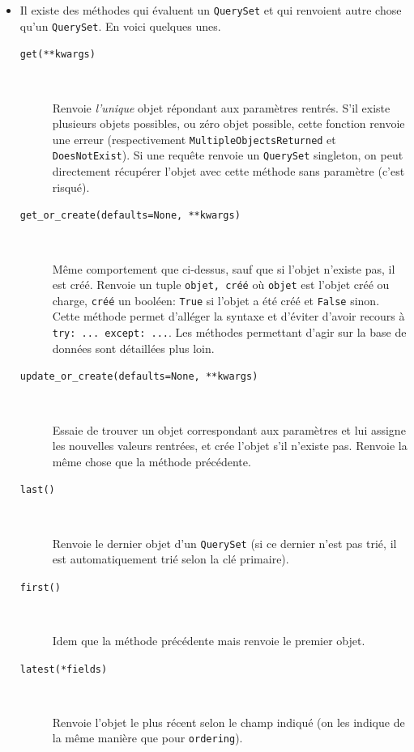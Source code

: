 \documentclass[a4paper, 10pt]{article}
\newcommand{\code}[1]{{\small\texttt{#1}}}
\begin{document}
{\begin{itemize}
    \item Il existe des méthodes qui évaluent un \code{QuerySet} et qui renvoient autre chose qu'un \code{QuerySet}. En voici quelques unes.

    \begin{description}
        \item[\texttt{get(**kwargs)}]~

        Renvoie \emph{l'unique} objet répondant aux paramètres rentrés. S'il existe plusieurs objets possibles, ou zéro objet possible, cette fonction renvoie une erreur (respectivement \code{MultipleObjectsReturned} et \code{DoesNotExist}). Si une requête renvoie un \code{QuerySet} singleton, on peut directement récupérer l'objet avec cette méthode sans paramètre (c'est risqué).

        \item[\texttt{get_or_create(defaults=None, **kwargs)}]~

        Même comportement que ci-dessus, sauf que si l'objet n'existe pas, il est créé. Renvoie un tuple \code{objet, créé} où \code{objet} est l'objet créé ou charge, \code{créé} un booléen: \texttt{True} si l'objet a été créé et \texttt{False} sinon. Cette méthode permet d'alléger la syntaxe et d'éviter d'avoir recours à \code{try: ... except: ...}. Les méthodes permettant d'agir sur la base de données sont détaillées plus loin.

        \item[\texttt{update_or_create(defaults=None, **kwargs)}]~

        Essaie de trouver un objet correspondant aux paramètres et lui assigne les nouvelles valeurs rentrées, et crée l'objet s'il n'existe pas. Renvoie la même chose que la méthode précédente.

        \item[\texttt{last()}]~

        Renvoie le dernier objet d'un \code{QuerySet} (si ce dernier n'est pas trié, il est automatiquement trié selon la clé primaire).

        \item[\texttt{first()}]~

        Idem que la méthode précédente mais renvoie le premier objet.

        \item[\texttt{latest(*fields)}]~

        Renvoie l'objet le plus récent selon le champ indiqué (on les indique de la même manière que pour \code{ordering}).


\end{description}
\end{itemize}}
\end{document}
